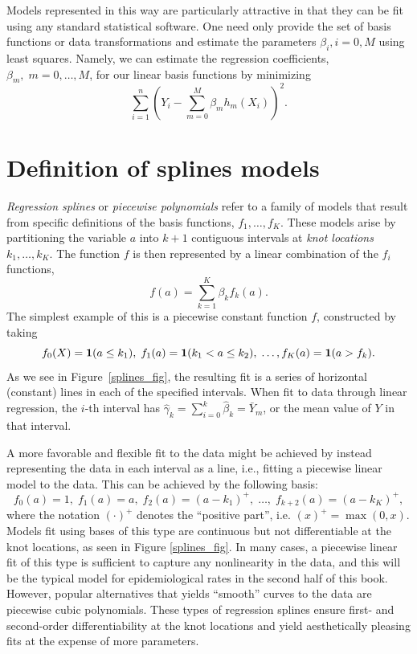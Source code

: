 Models represented in this way are particularly attractive in that
they can be fit using any standard statistical software. One need only
provide the set of basis functions or data transformations and
estimate the parameters $\beta_i, i=0, M$ using least squares. Namely,
we can estimate the regression coefficients, $\beta_m,\; m=0, \dots,
M$, for our linear basis functions by minimizing 
\[
\sum_{i=1}^n\left(Y_i - \sum_{m=0}^M \beta_mh_m(X_i)\right)^2.
\]

\section{Definition of splines models}

\emph{Regression splines} or \emph{piecewise polynomials} refer to a
family of models that result from specific definitions of the basis
functions, $f_1,\ldots,f_K$. These models arise by partitioning the variable $a$
into $k+1$ contiguous intervals at \emph{knot locations} $k_1,
\dots, k_{K}$. The function $f$ is then represented by a linear combination of the $f_i$ functions,
\[
f(a) = \sum_{k=1}^K \beta_k f_k(a).
\]
The simplest example of this is a
piecewise constant function $f$, constructed by taking
\[
f_0(X) = \mathbf{1}(a \leq k_1),\; f_1(a)=\mathbf{1}(k_1 < a \leq k_2), \;
\ldots, f_{K}(a) = \mathbf{1}(a > f_k). 
\]
As we see in Figure~\ref{splines_fig}, the resulting fit is a series
of horizontal (constant) lines in each of the specified
intervals. When fit to data through linear regression, the $i$-th
interval has $\hat{\gamma}_k = \sum_{i=0}^k \hat{\beta}_k =
\bar{Y}_m$, or the mean value of $Y$ in that interval.

A more favorable and flexible fit to the data might be achieved by
instead representing the data in each interval as a line, i.e., fitting
a piecewise linear model to the data. This can be achieved by the
following basis:
\[
f_0(a) = 1,\; f_1(a) = a,\; f_2(a) = (a-k_1)^+,\; \ldots,\;
f_{k+2}(a)=(a-k_K)^+,
\]
where the notation $(\cdot)^+$ denotes the ``positive part'',
i.e. $(x)^+ = \max(0, x)$. Models fit using bases of this type are
continuous but not differentiable at the knot locations, as seen in
Figure \ref{splines_fig}. In many cases, a piecewise linear fit of
this type is sufficient to capture any nonlinearity in the data, and
this will be the typical model for epidemiological rates in the second
half of this book. However, popular alternatives that yields
``smooth'' curves to the data are piecewise cubic polynomials. These
types of regression splines ensure first- and second-order
differentiability at the knot locations and yield aesthetically
pleasing fits at the expense of more parameters.


